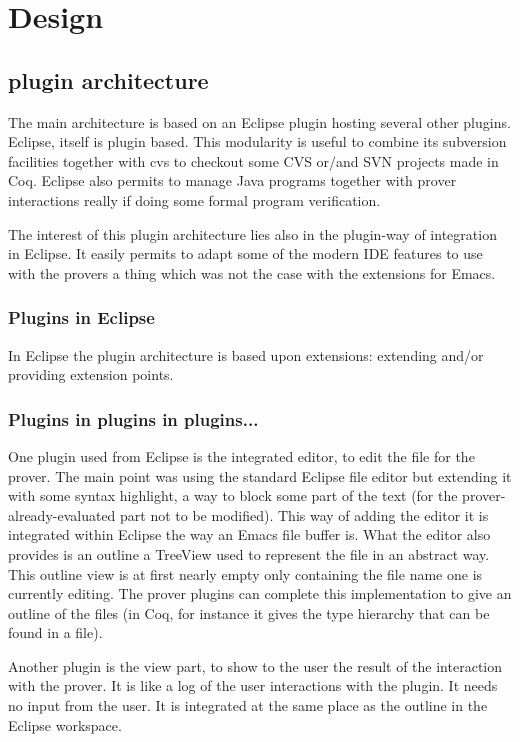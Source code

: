 \documentclass{entcs}
\begin{document}
\section{Design}

\subsection{plugin architecture}
The main architecture is based on an Eclipse plugin hosting several other
plugins. Eclipse, itself is plugin based. This modularity is useful to 
combine its subversion facilities together with cvs to checkout some 
CVS or/and SVN projects made in Coq. Eclipse also permits to manage 
Java programs together with prover interactions really 
if doing some formal program verification.

The interest of this plugin architecture lies also in the plugin-way of 
integration in Eclipse. It easily permits to adapt some of the modern 
IDE features to use with the provers a thing which was not the case
with the extensions for Emacs.
\subsubsection{Plugins in Eclipse}
In Eclipse the plugin architecture is based upon extensions:
extending and/or providing extension points.
\subsubsection{Plugins in plugins in plugins...}
One plugin used from Eclipse is the integrated editor, to edit the 
file for the prover. The main point was using the standard Eclipse file editor
but extending it with some syntax highlight, a way to block some part
of the text (for the prover-already-evaluated part not to be modified). This
way of adding the editor it is integrated within Eclipse the way an Emacs 
file buffer is.  What the editor also provides is an outline a TreeView
used to represent the file in an abstract way. This outline view
is at first nearly empty only containing the file name one is currently
editing. The prover plugins can complete this implementation to give
an outline of the files (in Coq, for instance it gives the type
hierarchy that can be found in a file).

Another plugin is the view part, to show to the user the result of the
interaction with the prover. It is like a log of the user interactions
with the plugin. It needs no input from the user. It is integrated
at the same place as the outline in the Eclipse workspace.
\end{document}

